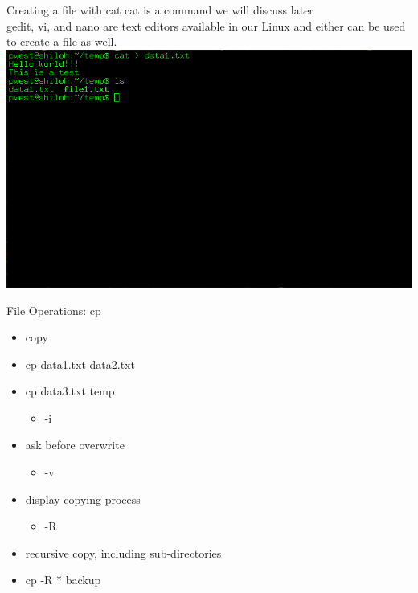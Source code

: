 \documentclass{beamer}
\begin{document}
\begin{frame}{Creating a file with cat}
cat is a command we will discuss later\\
gedit, vi, and nano are text editors available in our Linux and either can be used to create a file as well.
\includegraphics[width=1.0\textwidth]{../imgs/file-create.png} \\
\end{frame}

\begin{frame}{File Operations: cp}
\begin{itemize}
\item copy
\item cp data1.txt data2.txt
\item cp data3.txt temp
\begin{itemize}
\item -i
\end{itemize}
\item ask before overwrite
\begin{itemize}
\item -v 
\end{itemize}
\item display copying process
\begin{itemize}
\item -R
\end{itemize}
\item recursive copy, including sub-directories
\item cp -R * backup
\end{itemize}
\end{frame}
\end{document}
